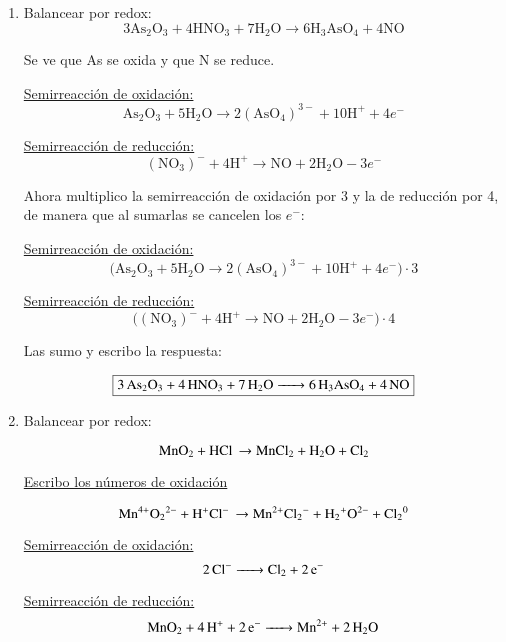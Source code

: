 \begin{enumerate}

\item Balancear por redox:
$$3\text{As}_2\text{O}_3 + 4\text{HNO}_3 + 7\text{H}_2\text{O} \rightarrow
6\text{H}_3 \text{AsO}_4 + 4\text{NO}$$

Se ve que As se oxida y que N se reduce.

\begin{multicols}{2}

\underline{Semirreacción de oxidación:}
$$\text{As}_2\text{O}_3 + 5\text{H}_2\text{O}\longrightarrow
2(\text{AsO}_4)^{3-} + 10\text{H}^+ + 4e^-$$

\underline{Semirreacción de reducción:}
$$(\text{NO}_3)^{-} + 4 \text{H}^+ \longrightarrow
\text{NO} + 2\text{H}_2\text{O} - 3e^-$$
\end{multicols}

Ahora multiplico la semirreacción de oxidación por 3 y la de reducción por 4, de manera que al sumarlas se cancelen los $e^-$:

\begin{multicols}{2}

\underline{Semirreacción de oxidación:}
$$\big(\text{As}_2\text{O}_3 + 5\text{H}_2\text{O}\longrightarrow
2(\text{AsO}_4)^{3-} + 10\text{H}^+ + 4e^-\big) \cdot 3$$

\underline{Semirreacción de reducción:}
$$\big((\text{NO}_3)^{-} + 4 \text{H}^+ \longrightarrow
\text{NO} + 2\text{H}_2\text{O} - 3e^-\big) \cdot 4$$
\end{multicols}

\noindent
Las sumo y escribo la respuesta:

$$\fbox{\ce{3As_2O_3 + 4HNO_3 + 7H_2O -> 6H_3AsO_4 + 4NO}}$$

\item Balancear por redox:

$$\ce{MnO_2 + HCl \rightarrow MnCl_2 + H_2O + Cl_2}$$

\underline{Escribo los números de oxidación}

$$\ce{Mn^{4+}O_2^{2-} + H^{+}Cl^{-} \rightarrow Mn^{2+}Cl_2^{-} + H_2^{+}O^{2-} + Cl_2^{0}}$$

\begin{multicols}{2}
    \underline{Semirreacción de oxidación:}
    $$\ce{2Cl^- ->
    Cl_2 + 2e^-}$$
    
    \underline{Semirreacción de reducción:}
    $$\ce{MnO_2 + 4 H^+ + 2e^- ->
    Mn^{2+} + 2H_2O}$$
\end{multicols}


\end{enumerate}
